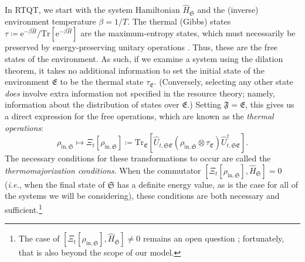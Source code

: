 \documentclass[preprints,article,accept,moreauthors,pdftex]{Definitions/mdpi}
\begin{document}
\begin{paracol}{2}
In RTQT, we start with the system Hamiltonian $\widehat{H}_{\mathfrak{S}}$ and the (inverse) environment temperature $\beta=1/T$. The thermal (Gibbs) states $\tau \coloneqq \mathrm{e}^{-\beta\widehat{H}}/ \mathrm{Tr}\left[\mathrm{e}^{-\beta\widehat{H}}\right]$ are the maximum-entropy states, which must necessarily be preserved by energy-preserving unitary operations \cite{BHNOW15}. Thus, these are the free states of the environment. As such, if we examine a system using the dilation theorem, it takes no additional information to set the initial state of the environment $\mathfrak{E}$ to be the thermal state $\tau_{\mathfrak{E}}$. (Conversely, selecting any other state \emph{does} involve extra information not specified in the resource theory; namely, information about the distribution of states over $\mathfrak{E}$.) Setting $\mathfrak{F}=\mathfrak{E}$, this gives us a direct expression for the free operations, which are known as the \emph{thermal operations}:
\begin{equation}
    \label{eq:TO}
    \rho_{\mathrm{in},\mathfrak{S}} \mapsto \Xi_{t}\left[\rho_{\mathrm{in},\mathfrak{S}}\right] \coloneqq \mathrm{Tr}_{\mathfrak{E}} \left[ \widehat{U}_{t,\mathfrak{SE}} \left( \rho_{\mathrm{in},\mathfrak{S}} \otimes \tau_{\mathfrak{E}} \right) \widehat{U}_{t,\mathfrak{SE}}^{\dagger} \right].
\end{equation}
The necessary conditions for these transformations to occur are called the \emph{thermomajorization conditions}. When the commutator $\left[\Xi_{t}\left[\rho_{\mathrm{in},\mathfrak{S}}\right],\widehat{H}_{\mathfrak{S}}\right] = 0$ (\emph{i.e.}, when the final state of $\mathfrak{S}$ has a definite energy value, as is the case for all of the systems we will be considering), these conditions are both necessary and sufficient.\footnote{The case of $\left[\Xi_{t}\left[\rho_{\mathrm{in},\mathfrak{S}}\right],\widehat{H}_{\mathfrak{S}}\right] \ne 0$ remains an open question \cite{CG19}; fortunately, that is also beyond the scope of our model.}


\end{paracol}
\end{document}
